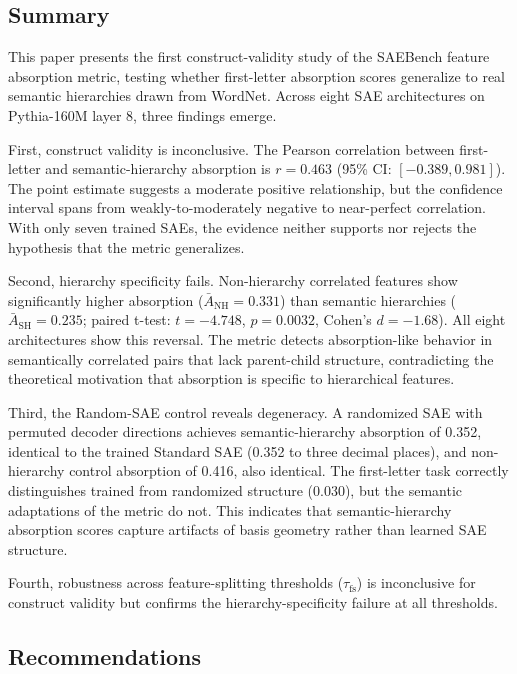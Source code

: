 \documentclass{article}
\begin{document}
\subsection{Summary}

This paper presents the first construct-validity study of the SAEBench feature absorption metric, testing whether first-letter absorption scores generalize to real semantic hierarchies drawn from WordNet. Across eight SAE architectures on Pythia-160M layer 8, three findings emerge.

First, construct validity is inconclusive. The Pearson correlation between first-letter and semantic-hierarchy absorption is $r = 0.463$ (95\% CI: $[-0.389, 0.981]$). The point estimate suggests a moderate positive relationship, but the confidence interval spans from weakly-to-moderately negative to near-perfect correlation. With only seven trained SAEs, the evidence neither supports nor rejects the hypothesis that the metric generalizes.

Second, hierarchy specificity fails. Non-hierarchy correlated features show significantly higher absorption ($\bar{A}_{\text{NH}} = 0.331$) than semantic hierarchies ($\bar{A}_{\text{SH}} = 0.235$; paired t-test: $t = -4.748$, $p = 0.0032$, Cohen's $d = -1.68$). All eight architectures show this reversal. The metric detects absorption-like behavior in semantically correlated pairs that lack parent-child structure, contradicting the theoretical motivation that absorption is specific to hierarchical features.

Third, the Random-SAE control reveals degeneracy. A randomized SAE with permuted decoder directions achieves semantic-hierarchy absorption of 0.352, identical to the trained Standard SAE (0.352 to three decimal places), and non-hierarchy control absorption of 0.416, also identical. The first-letter task correctly distinguishes trained from randomized structure (0.030), but the semantic adaptations of the metric do not. This indicates that semantic-hierarchy absorption scores capture artifacts of basis geometry rather than learned SAE structure.

Fourth, robustness across feature-splitting thresholds ($\tau_{\text{fs}}$) is inconclusive for construct validity but confirms the hierarchy-specificity failure at all thresholds.

\subsection{Recommendations}
\end{document}
